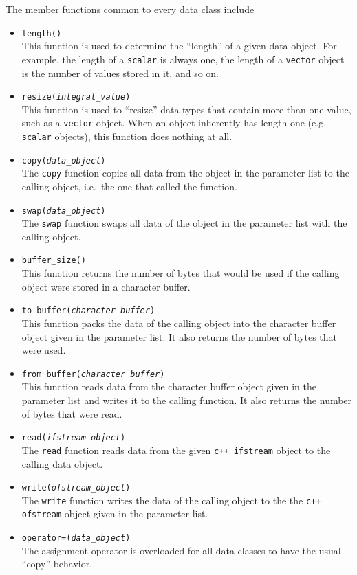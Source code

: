 The member functions common to every \MMSP data class include
\begin{itemize}
\item {\tt length()} \\
This function is used to determine the ``length'' of a given data object.  For example, the length of a {\tt scalar} is always one, the length of a {\tt vector} object is the number of values stored in it, and so on.

\item {\tt resize({\it integral\_value})} \\
This function is used to ``resize'' data types that contain more than one value, such as a {\tt vector} object.  When an object inherently has length one (e.g. {\tt scalar} objects), this function does nothing at all.

\item {\tt copy({\it data\_object})} \\
The {\tt copy} function copies all data from the object in the parameter list to the calling object, i.e.\ the one that called the function.

\item {\tt swap({\it data\_object})} \\
The {\tt swap} function swaps all data of the object in the parameter list with the calling object.

\item {\tt buffer\_size()} \\
This function returns the number of bytes that would be used if the calling object were stored in a character buffer.

\item {\tt to\_buffer({\it character\_buffer})} \\
This function packs the data of the calling object into the character buffer object given in the parameter list.  It also returns the number of bytes that were used.

\item {\tt from\_buffer({\it character\_buffer})} \\
This function reads data from the character buffer object given in the parameter list and writes it to the calling function.  It also returns the number of bytes that were read.

\item {\tt read({\it ifstream\_object})} \\
The {\tt read} function reads data from the given {\tt c++ ifstream} object to the calling data object.

\item {\tt write({\it ofstream\_object})} \\
The {\tt write} function writes the data of the calling object to the the {\tt c++ ofstream} object given in the parameter list.

\item {\tt operator=({\it data\_object})} \\
The assignment operator is overloaded for all \MMSP data classes to have the usual ``copy'' behavior.
\end{itemize}
